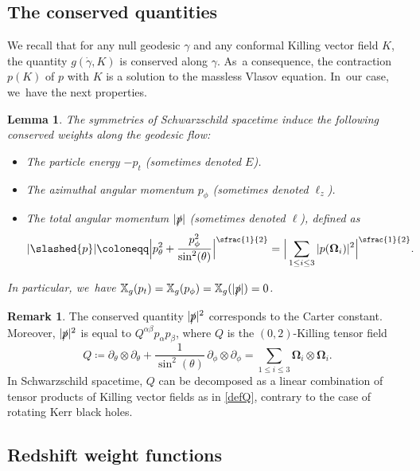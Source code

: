\documentclass[10pt]{amsart}
\theoremstyle{plain}
\newtheorem{lemma}[proposition]{Lemma}
\theoremstyle{definition}
\newtheorem{remark}[proposition]{Remark}
\newcommand\T{{\mathbb{X}}}
\begin{document}
\subsection{The conserved quantities}

We recall that for any null geodesic $\gamma$ and any conformal Killing vector field $K$, the quantity $g(\dot{\gamma},K)$ is conserved along $\gamma$. As~a consequence, the contraction $p(K)$ of $p$ with $K$ is a solution to the massless Vlasov equation. In~our case, we~have the next properties.

\begin{lemma}\label{Lemconsqua}
The symmetries of Schwarzschild spacetime induce the following conserved weights along the geodesic flow:
\begin{itemize}
\item The \textit{particle energy} $-p_t$ (sometimes denoted $E$).
\item The \textit{azimuthal angular momentum} $p_\phi$ (sometimes denoted $\ell_z$).
\item The \textit{total angular momentum} $|\slashed{p}|$ (sometimes denoted $\ell$), defined as
\[
|\slashed{p}| \coloneqq \Big| p_\theta^2+ \frac{p_\phi^2}{\sin^2 (\theta)} \Big|^{\sfrac{1}{2}}= \Big|\sum_{1 \leq i \leq 3} |p(\mathbf{\Omega}_i)|^2\Big|^{\sfrac{1}{2}}.
\]
\end{itemize}
In particular, we~have $\T_g (p_t)=\T_g(p_\phi)=\T_g (|\slashed{p}|)=0$.
\end{lemma}
\begin{remark}
The conserved quantity $|\slashed{p}|^2$ corresponds to the Carter constant. Moreover, $|\slashed{p}|^2$ is equal to $Q^{\alpha \beta}p_\alpha p_\beta$, where $Q$ is the $(0,2)$-Killing tensor field
\begin{equation}\label{defQ}
Q\coloneqq \partial_\theta \otimes \partial_\theta+\frac{1}{\sin^2 (\theta) }\, \partial_\phi \otimes \partial_\phi = \sum_{1 \leq i \leq 3} \mathbf{\Omega}_i \otimes \mathbf{\Omega}_i.
\end{equation}
In Schwarzschild spacetime, $Q$ can be decomposed as a linear combination of tensor products of Killing vector fields as in \eqref{defQ}, contrary to the case of rotating Kerr black holes.
\end{remark}

\subsection{Redshift weight functions}\label{Subsecredshift}
\end{document}
